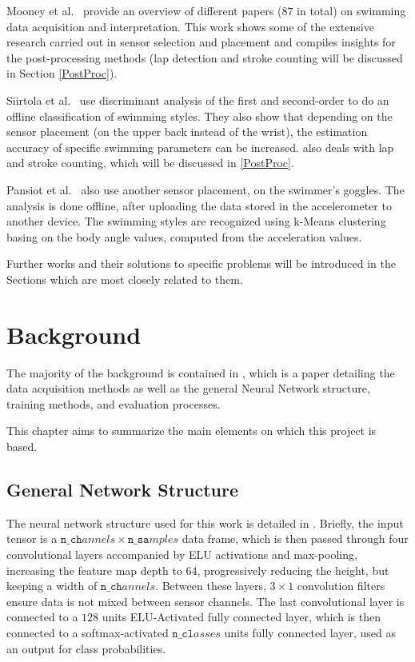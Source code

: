 \documentclass[a4paper, oneside]{discothesis}
\begin{document}
Mooney et al.~\cite{MCGQ+15} provide an overview of different papers ($87$ in total) on swimming data acquisition and interpretation. This work shows some of the extensive research carried out in sensor selection and placement and compiles insights for the post-processing methods (lap detection and stroke counting will be discussed in Section \ref{PostProc}).

Siirtola et al.~\cite{SLR11} use discriminant analysis of the first and second-order to do an offline classification of swimming styles. They also show that depending on the sensor placement (on the upper back instead of the wrist), the estimation accuracy of specific swimming parameters can be increased. \cite{SLR11} also deals with lap and stroke counting, which will be discussed in \ref{PostProc}.

Pansiot et al.~\cite{PLY10} also use another sensor placement, on the swimmer's goggles. The analysis is done offline, after uploading the data stored in the accelerometer to another device. The swimming styles are recognized using k-Means clustering basing on the body angle values, computed from the acceleration values.

Further works and their solutions to specific problems will be introduced in the Sections which are most closely related to them.

\chapter{Background}\label{background}
The majority of the background is contained in \cite{BMSW19}, which is a paper detailing the data acquisition methods as well as the general Neural Network structure, training methods, and evaluation processes.

This chapter aims to summarize the main elements on which this project is based.
\section{General Network Structure}\label{genNetStruct}
The neural network structure used for this work is detailed in \cite[ch.4]{BMSW19}. Briefly, the input tensor is a $\mathtt{n\_ch}annels\times \mathtt{n\_sa}mples$ data frame, which is then passed through four convolutional layers accompanied by ELU activations and max-pooling, increasing the feature map depth to $64$, progressively reducing the height, but keeping a width of $\mathtt{n\_ch}annels$. Between these layers, $3\times 1$ convolution filters ensure data is not mixed between sensor channels. The last convolutional layer is connected to a $128$ units ELU-Activated fully connected layer, which is then connected to a softmax-activated $\mathtt{n\_cl}asses$ units fully connected layer, used as an output for class probabilities.
\end{document}
